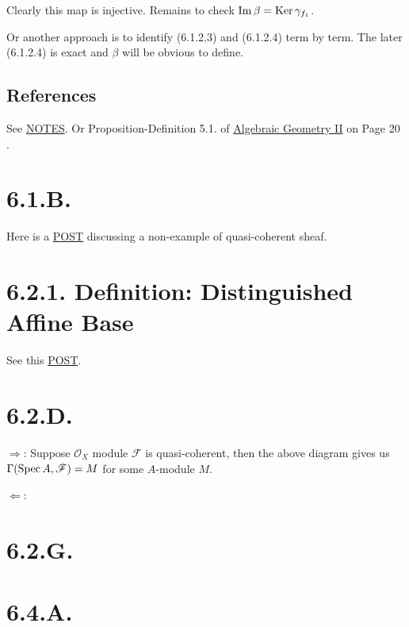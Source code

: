 Clearly this map is injective. Remains to check $\operatorname{Im} \beta=\operatorname{Ker} \gamma_{f_1}$.

Or another approach is to identify (6.1.2.3) and (6.1.2.4) term by term. The later (6.1.2.4) is exact and $\beta$ will be obvious to define. 

\subsection{References}

See \href{https://www.math.brown.edu/dabramov/MA/s1718/MA205-OModules.pdf}{NOTES}. Or Proposition-Definition 5.1. of \href{https://www.dam.brown.edu/people/mumford/alg_geom/papers/AGII.pdf}{Algebraic Geometry II} on Page 20 \cite{}.


\section{6.1.B.}

Here is a \href{https://math.stackexchange.com/questions/467197/examples-of-mathcalo-x-modules-that-are-not-quasi-coherent-sheaves}{POST} discussing a non-example of quasi-coherent sheaf.

\section{6.2.1. Definition: Distinguished Affine Base}

See this \href{https://math.stackexchange.com/questions/4304402/why-is-vakils-definition-of-distinguished-affine-base-of-a-scheme-not-a-base}{POST}.

\section{6.2.D.}

$\Rightarrow$: Suppose $\mathscr O_X$ module $\mathscr F$ is quasi-coherent, then the above diagram gives us $\Gamma(\operatorname{Spec} A,\mathscr F)=M$ for some $A$-module $M$. 

$\Leftarrow$: 

\section{6.2.G.}

\section{6.4.A.}


